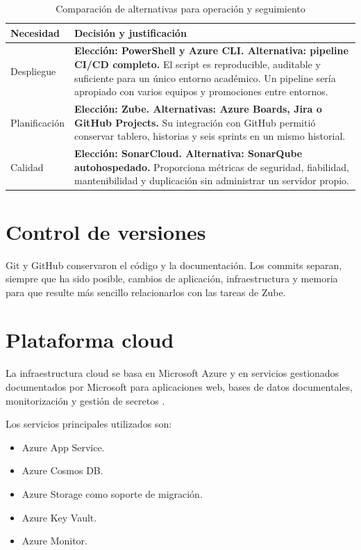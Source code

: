 \begin{table}[ht]
\centering
\footnotesize
\begin{tabularx}{\textwidth}{p{3.1cm} X}
\textbf{Necesidad} & \textbf{Decisión y justificación} \\
\hline
Despliegue & \textbf{Elección: PowerShell y Azure CLI. Alternativa: pipeline CI/CD completo.} El script es reproducible, auditable y suficiente para un único entorno académico. Un pipeline sería apropiado con varios equipos y promociones entre entornos. \\
Planificación & \textbf{Elección: Zube. Alternativas: Azure Boards, Jira o GitHub Projects.} Su integración con GitHub permitió conservar tablero, historias y seis sprints en un mismo historial. \\
Calidad & \textbf{Elección: SonarCloud. Alternativa: SonarQube autohospedado.} Proporciona métricas de seguridad, fiabilidad, mantenibilidad y duplicación sin administrar un servidor propio. \\
\end{tabularx}
\caption{Comparación de alternativas para operación y seguimiento}
\label{tabla:comparacion_operacion}
\end{table}

\section{Control de versiones}

Git y GitHub conservaron el código y la documentación. Los commits separan, siempre que ha sido posible, cambios de aplicación, infraestructura y memoria para que resulte más sencillo relacionarlos con las tareas de Zube.

\section{Plataforma cloud}

La infraestructura cloud se basa en Microsoft Azure y en servicios gestionados documentados por Microsoft para aplicaciones web, bases de datos documentales, monitorización y gestión de secretos \cite{azure_appservice_python_quickstart,azure_cosmos_python,azure_appservice_keyvault_python,azure_monitor}.

Los servicios principales utilizados son:

\begin{itemize}
    \item Azure App Service.
    \item Azure Cosmos DB.
    \item Azure Storage como soporte de migración.
    \item Azure Key Vault.
    \item Azure Monitor.
\end{itemize}


